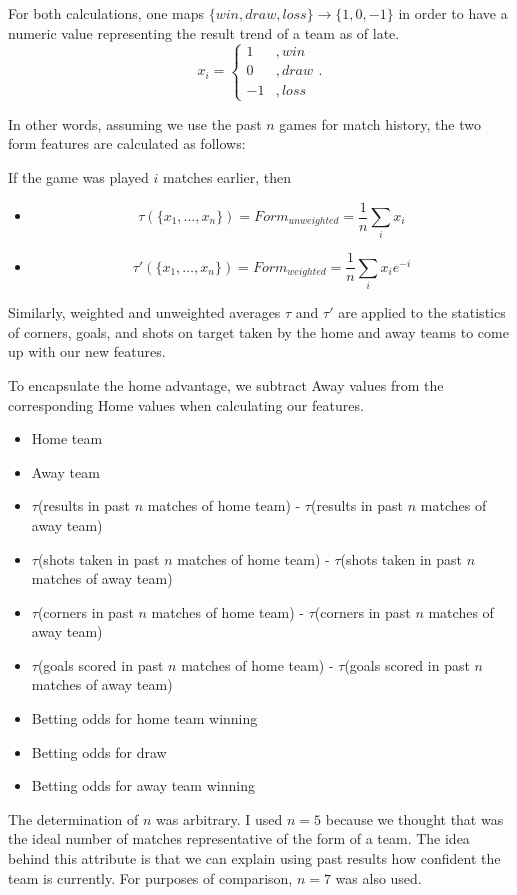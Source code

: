 \documentclass[paper=a4, fontsize=11pt]{scrartcl}
\numberwithin{equation}{section}		%
\numberwithin{figure}{section}			%
\numberwithin{table}{section}				%
\begin{document}
For both calculations, one maps $\{win, draw, loss\} \to \{1, 0, -1\}$ in order to have a numeric value representing the result trend of a team as of late. $$x_i = \begin{cases} 1&, win \\ 0&, draw \\ -1&, loss \end{cases}.$$

In other words, assuming we use the past $n$ games for match history, the two form features are calculated as follows:

If the game was played $i$ matches earlier, then
\begin{itemize}
\item $$\tau(\{ x_1,\ldots,x_n\}) = Form_{unweighted} = \frac{1}{n} \sum_i x_i$$
\item $$\tau'(\{ x_1,\ldots,x_n\}) = Form_{weighted} = \frac{1}{n} \sum_i x_i e^{-i}$$
\end{itemize}

Similarly, weighted and unweighted averages $\tau$ and $\tau'$ are applied to the statistics of corners, goals, and shots on target taken by the home and away teams to come up with our new features.

To encapsulate the home advantage, we subtract Away values from the corresponding Home values when calculating our features.

\begin{itemize}
\item Home team
\item Away team
\item $\tau$(results in past $n$ matches of home team) - $\tau$(results in past $n$ matches of away team)
\item $\tau$(shots taken in past $n$ matches of home team) - $\tau$(shots taken in past $n$ matches of away team)
\item $\tau$(corners in past $n$ matches of home team) - $\tau$(corners in past $n$ matches of away team)
\item $\tau$(goals scored in past $n$ matches of home team) - $\tau$(goals scored in past $n$ matches of away team)
\item Betting odds for home team winning
\item Betting odds for draw
\item Betting odds for away team winning
\end{itemize}

The determination of $n$ was arbitrary. I used $n=5$ because we thought that was the ideal number of matches representative of the form of a team. The idea behind this attribute is that we can explain using past results how confident the team is currently. For purposes of comparison, $n=7$ was also used.
\end{document}
